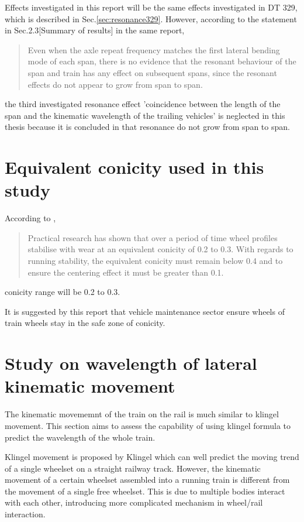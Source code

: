 Effects investigated in this report will be the same effects investigated in DT 329, which is described in Sec.\ref{sec:resonance329}. However, according to the statement in Sec.2.3[Summary of results] in the same report,

\begin{quote}
Even when the axle repeat frequency matches the first lateral bending mode of each span, there is no evidence that the resonant behaviour of the span and train has any effect on subsequent spans, since the resonant effects do not appear to grow from span to span.
\end{quote}

the third investigated resonance effect 'coincidence between the length of the span and the kinematic wavelength of the trailing vehicles' is neglected in this thesis because it is concluded in \citet{d181dt329} that resonance do not grow from span to span. 


\section{Equivalent conicity used in this study}
According to \citet[Section.2.6]{esveld2001modern}, 

\begin{quote}
    Practical research has shown that over a period of time wheel profiles stabilise with wear at an equivalent conicity of 0.2 to 0.3. With regards to running stability, the equivalent conicity must remain below 0.4 and to ensure the centering effect it must be greater than 0.1.
\end{quote}

conicity range will be 0.2 to 0.3.

It is suggested by this report that vehicle maintenance sector ensure wheels of train wheels stay in the safe zone of conicity. 


\section{Study on wavelength of lateral kinematic movement}

The kinematic movememnt of the train on the rail is much similar to klingel movement. This section aims to assess the capability of using klingel formula to predict the wavelength of the whole train.

Klingel movement is proposed by Klingel which can well predict the moving trend of a single wheelset on a straight railway track. However, the kinematic movement of a certain wheelset assembled into a running train is different from the movement of a single free wheelset. This is due to multiple bodies interact with each other, introducing more complicated mechanism in wheel/rail interaction. 

